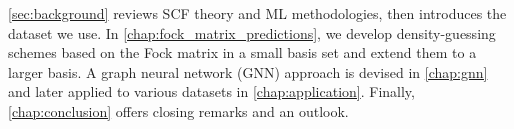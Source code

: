 \autoref{sec:background} reviews SCF theory and ML methodologies, then introduces the dataset we use. In \autoref{chap:fock_matrix_predictions}, we develop density-guessing schemes based on the Fock matrix in a small basis set and extend them to a larger basis. A graph neural network (GNN) approach is devised in \autoref{chap:gnn} and later applied to various datasets in \autoref{chap:application}. Finally, \autoref{chap:conclusion} offers closing remarks and an outlook.



